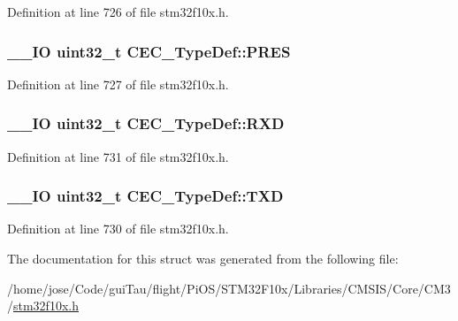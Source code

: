 Definition at line 726 of file stm32f10x.\-h.

\hypertarget{struct_c_e_c___type_def_a2e1d5865f3d49a195e58f265b425256e}{
\subsubsection[{P\-R\-E\-S}]{\setlength{\rightskip}{0pt plus 5cm}\-\_\-\-\_\-\-I\-O {\bf uint32\-\_\-t} C\-E\-C\-\_\-\-Type\-Def\-::\-P\-R\-E\-S}}\label{struct_c_e_c___type_def_a2e1d5865f3d49a195e58f265b425256e}


Definition at line 727 of file stm32f10x.\-h.

\hypertarget{struct_c_e_c___type_def_a13d5b0e5228d5cca9f7c5d8533705d21}{
\subsubsection[{R\-X\-D}]{\setlength{\rightskip}{0pt plus 5cm}\-\_\-\-\_\-\-I\-O {\bf uint32\-\_\-t} C\-E\-C\-\_\-\-Type\-Def\-::\-R\-X\-D}}\label{struct_c_e_c___type_def_a13d5b0e5228d5cca9f7c5d8533705d21}


Definition at line 731 of file stm32f10x.\-h.

\hypertarget{struct_c_e_c___type_def_a462a952588fc45732d4545dbe79356da}{
\subsubsection[{T\-X\-D}]{\setlength{\rightskip}{0pt plus 5cm}\-\_\-\-\_\-\-I\-O {\bf uint32\-\_\-t} C\-E\-C\-\_\-\-Type\-Def\-::\-T\-X\-D}}\label{struct_c_e_c___type_def_a462a952588fc45732d4545dbe79356da}


Definition at line 730 of file stm32f10x.\-h.



The documentation for this struct was generated from the following file\-:\begin{DoxyCompactItemize}
\item 
/home/jose/\-Code/gui\-Tau/flight/\-Pi\-O\-S/\-S\-T\-M32\-F10x/\-Libraries/\-C\-M\-S\-I\-S/\-Core/\-C\-M3/\hyperlink{stm32f10x_8h}{stm32f10x.\-h}\end{DoxyCompactItemize}
